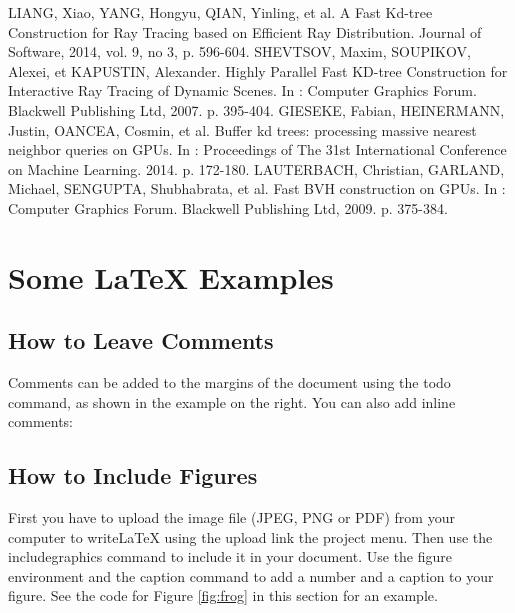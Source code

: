 \documentclass[a4paper]{article}
\begin{document}
\begin{thebibliography}{1}
	 LIANG, Xiao, YANG, Hongyu, QIAN, Yinling, et al. A Fast Kd-tree Construction for Ray Tracing based on Efficient Ray Distribution. Journal of Software, 2014, vol. 9, no 3, p. 596-604.
	 SHEVTSOV, Maxim, SOUPIKOV, Alexei, et KAPUSTIN, Alexander. Highly Parallel Fast KD-tree Construction for Interactive Ray Tracing of Dynamic Scenes. In : Computer Graphics Forum. Blackwell Publishing Ltd, 2007. p. 395-404.
	 GIESEKE, Fabian, HEINERMANN, Justin, OANCEA, Cosmin, et al. Buffer kd trees: processing massive nearest neighbor queries on GPUs. In : Proceedings of The 31st International Conference on Machine Learning. 2014. p. 172-180.
	 LAUTERBACH, Christian, GARLAND, Michael, SENGUPTA, Shubhabrata, et al. Fast BVH construction on GPUs. In : Computer Graphics Forum. Blackwell Publishing Ltd, 2009. p. 375-384.
\end{thebibliography}

\section{Some \LaTeX{} Examples}
\label{sec:examples}

\subsection{How to Leave Comments}

Comments can be added to the margins of the document using the  todo command, as shown in the example on the right. You can also add inline comments:


\subsection{How to Include Figures}

First you have to upload the image file (JPEG, PNG or PDF) from your computer to writeLaTeX using the upload link the project menu. Then use the includegraphics command to include it in your document. Use the figure environment and the caption command to add a number and a caption to your figure. See the code for Figure \ref{fig:frog} in this section for an example.

\end{document}
